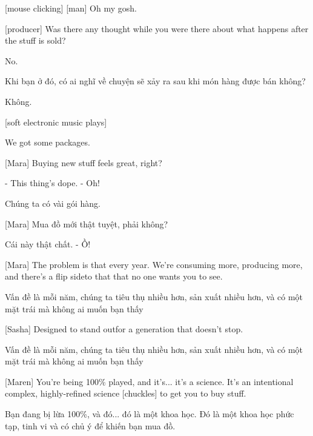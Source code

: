 \documentclass[a4paper]{article}
\begin{document}
	
	[mouse clicking] [man] Oh my gosh.
	
	[producer] Was there any thought while you were there about what happens after the stuff is sold?
	
	No.
	
	\begin{vietnamese-v2}
		Khi bạn ở đó, có ai nghĩ về chuyện sẽ xảy ra sau khi món hàng được bán không?
		
		Không.
	\end{vietnamese-v2}
	
	[soft electronic music plays]
	
	We got some packages.
	
	[Mara] Buying new stuff feels great, right?
	
	- This thing's dope. - Oh!
	
	\begin{vietnamese-v2}
		
		Chúng ta có vài gói hàng.
		
		[Mara] Mua đồ mới thật tuyệt, phải không?
		
		Cái này thật chất. - Ồ!
	\end{vietnamese-v2}
	
	[Mara] The problem is that every year. We're consuming more, producing more\footnotemark[3], and there's a flip side\footnotemark[4] to that that no one wants you to see.
	
	\begin{vietnamese-v2}
		[Mara] Vấn đề là mỗi năm, chúng ta tiêu thụ nhiều hơn, sản xuất nhiều hơn, và có một mặt trái mà không ai muốn bạn thấy
	\end{vietnamese-v2}
	
	
	[Sasha] Designed to stand out\footnotemark[5] for a generation that doesn't stop.
	
	\begin{vietnamese-v2}
		[Mara] Vấn đề là mỗi năm, chúng ta tiêu thụ nhiều hơn, sản xuất nhiều hơn, và có một mặt trái mà không ai muốn bạn thấy
	\end{vietnamese-v2}
	
	
	[Maren] You're being 100\% played, and it's... it's a science. It's an intentional complex, highly-refined science [chuckles] to get you to buy stuff.
	
	\begin{vietnamese-v2}
		[Maren] Bạn đang bị lừa 100\%, và đó... đó là một khoa học. Đó là một khoa học phức tạp, tinh vi và có chủ ý để khiến bạn mua đồ.
	\end{vietnamese-v2}
	
\end{document}
